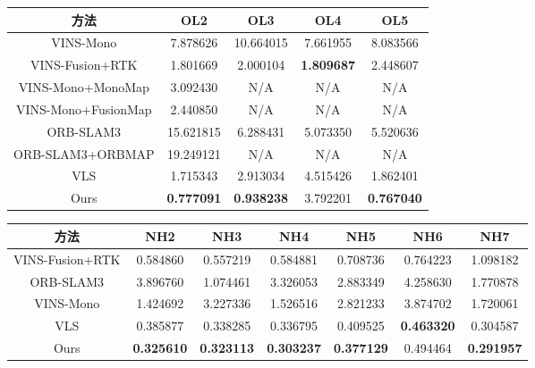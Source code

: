   \begin{table}
  \centering
  \begin{tabular}{ccccc}
  \toprule
  \textbf{方法}           & \textbf{OL2}      & \textbf{OL3}      & \textbf{OL4}      & \textbf{OL5}      \\ \midrule
  VINS-Mono           & 7.878626          & 10.664015         & 7.661955          & 8.083566          \\
  VINS-Fusion+RTK     & 1.801669          & 2.000104          & \cellcolor[HTML]{FA7F6F}\textbf{1.809687}          & 2.448607          \\
  VINS-Mono+MonoMap   & 3.092430          & N/A               & N/A               & N/A               \\
  VINS-Mono+FusionMap & 2.440850          & N/A               & N/A               & N/A               \\
  ORB-SLAM3           & 15.621815         & 6.288431          & 5.073350          & 5.520636          \\
  ORB-SLAM3+ORBMAP    & 19.249121         & N/A               & N/A               & N/A               \\
  VLS                 & 1.715343          & 2.913034          & 4.515426          & 1.862401          \\
  Ours                & \cellcolor[HTML]{FA7F6F}\textbf{0.777091} & \cellcolor[HTML]{FA7F6F}\textbf{0.938238} & 3.792201 & \cellcolor[HTML]{FA7F6F}\textbf{0.767040} \\ \bottomrule
  \end{tabular}
  \end{table}

  \begin{table}
  \centering
  \begin{tabular}{ccccccc}
  \toprule
  \textbf{方法}       & \textbf{NH2}      & \textbf{NH3}      & \textbf{NH4}      & \textbf{NH5}      & \textbf{NH6}      & \textbf{NH7}      \\ \midrule
  VINS-Fusion+RTK & 0.584860          & 0.557219          & 0.584881          & 0.708736          & 0.764223          & 1.098182          \\
  ORB-SLAM3       & 3.896760          & 1.074461          & 3.326053          & 2.883349          & 4.258630          & 1.770878          \\
  VINS-Mono       & 1.424692          & 3.227336          & 1.526516          & 2.821233          & 3.874702          & 1.720061          \\
  VLS             & 0.385877          & 0.338285          & 0.336795          & 0.409525          & \cellcolor[HTML]{FA7F6F}\textbf{0.463320} & 0.304587          \\
  Ours            & \cellcolor[HTML]{FA7F6F}\textbf{0.325610} & \cellcolor[HTML]{FA7F6F}\textbf{0.323113} & \cellcolor[HTML]{FA7F6F}\textbf{0.303237} & \cellcolor[HTML]{FA7F6F}\textbf{0.377129} & 0.494464          & \cellcolor[HTML]{FA7F6F}\textbf{0.291957} \\ \bottomrule
  \end{tabular}
  \end{table}